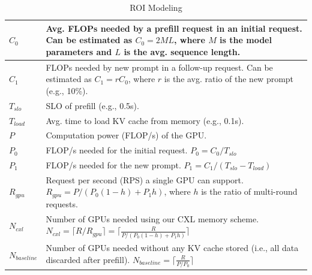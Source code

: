 \begin{table}[ht]
    \caption{ROI Modeling}
    \label{tab:roi}
    \centering
    \small %
    \begin{tabularx}{\columnwidth}{lX}
        \hline
        $C_{0}$         & Avg. FLOPs needed by a prefill request in an initial request. Can be estimated as $C_{0}=2ML$, where $M$ is the model parameters and $L$ is the avg. sequence length. \\ \hline
        $C_{1}$         & FLOPs needed by new prompt in a follow-up request. Can be estimated as $C_{1}=rC_0$, where $r$ is the avg. ratio of the new prompt (e.g., 10\%). \\ \hline
        $T_{slo}$       & SLO of prefill (e.g., 0.5s). \\ \hline
        $T_{load}$      & Avg. time to load KV cache from memory (e.g., 0.1s). \\ \hline
        $P$             & Computation power (FLOP/s) of the GPU. \\ \hline
        $P_0$           & FLOP/s needed for the initial request. $P_{0} = C_{0}/T_{slo}$ \\ \hline
        $P_1$           & FLOP/s needed for the new prompt. $P_{1}=C_{1}/(T_{slo}-T_{load})$  \\ \hline
        $R_{gpu}$       & Request per second (RPS) a single GPU can support. $R_{gpu} = P/(P_{0}(1-h)+P_{1}h)$, where $h$ is the ratio of multi-round requests. \\ \hline
        $N_{cxl}$       & Number of GPUs needed using our CXL memory scheme. $N_{cxl} = \lceil R/R_{gpu} \rceil = \lceil \frac{R}{P/(P_{0}(1-h)+P_{1}h)} \rceil$ \\ \hline
        $N_{baseline}$  & Number of GPUs needed without any KV cache stored (i.e., all data discarded after prefill). $N_{baseline} = \lceil \frac{R}{P/P_0} \rceil$\\ \hline
    \end{tabularx}
\end{table}


